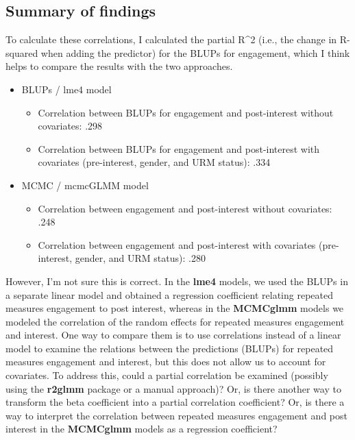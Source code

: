\documentclass[man]{apa6}
\providecommand{\tightlist}{%
  \setlength{\itemsep}{0pt}\setlength{\parskip}{0pt}}
\theoremstyle{definition}
\theoremstyle{definition}
\theoremstyle{definition}
\theoremstyle{remark}
\begin{document}
\subsection{Summary of findings}\label{summary-of-findings}

To calculate these correlations, I calculated the partial R\^{}2 (i.e.,
the change in R-squared when adding the predictor) for the BLUPs for
engagement, which I think helps to compare the results with the two
approaches.

\begin{itemize}
\tightlist
\item
  BLUPs / lme4 model

  \begin{itemize}
  \tightlist
  \item
    Correlation between BLUPs for engagement and post-interest without
    covariates: .298
  \item
    Correlation between BLUPs for engagement and post-interest with
    covariates (pre-interest, gender, and URM status): .334
  \end{itemize}
\item
  MCMC / mcmcGLMM model

  \begin{itemize}
  \tightlist
  \item
    Correlation between engagement and post-interest without covariates:
    .248
  \item
    Correlation between engagement and post-interest with covariates
    (pre-interest, gender, and URM status): .280
  \end{itemize}
\end{itemize}

However, I'm not sure this is correct. In the \textbf{lme4} models, we
used the BLUPs in a separate linear model and obtained a regression
coefficient relating repeated measures engagement to post interest,
whereas in the \textbf{MCMCglmm} models we modeled the correlation of
the random effects for repeated measures engagement and interest. One
way to compare them is to use correlations instead of a linear model to
examine the relations between the predictions (BLUPs) for repeated
measures engagement and interest, but this does not allow us to account
for covariates. To address this, could a partial correlation be examined
(possibly using the \textbf{r2glmm} package or a manual approach)? Or,
is there another way to transform the beta coefficient into a partial
correlation coefficient? Or, is there a way to interpret the correlation
between repeated measures engagement and post interest in the
\textbf{MCMCglmm} models as a regression coefficient?
\end{document}
